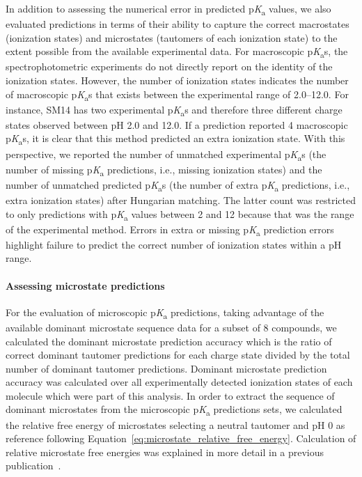 \documentclass[9pt,lineno,final]{elife}
\newcommand{\pKa}{p\textit{K}\textsubscript{a}}
\begin{document}
In addition to assessing the numerical error in predicted \pKa{} values, we also evaluated predictions in terms of their ability to capture the correct macrostates (ionization states) and microstates (tautomers of each ionization state) to the extent possible from the available experimental data. 
For macroscopic \pKa{}s, the spectrophotometric experiments do not directly report on the identity of the ionization states. 
However, the number of ionization states indicates the number of macroscopic \pKa{}s that exists between the experimental range of 2.0--12.0. 
For instance, SM14 has two experimental \pKa{}s and therefore three different charge states observed between pH 2.0 and 12.0. 
If a prediction reported 4 macroscopic \pKa{}s, it is clear that this method predicted an extra ionization state. 
With this perspective, we reported the number of unmatched experimental \pKa{}s (the number of missing \pKa{} predictions, i.e., missing ionization states) and the number of unmatched predicted \pKa{}s (the number of extra \pKa{} predictions, i.e., extra ionization states) after Hungarian matching. 
The latter count was restricted to only predictions with \pKa{} values between 2 and 12 because that was the range of the experimental method. 
Errors in extra or missing \pKa{} prediction errors highlight failure to predict the correct number of ionization states within a pH range.


\paragraph{Assessing microstate predictions}

For the evaluation of microscopic \pKa{} predictions, taking advantage of the available dominant microstate sequence data for a subset of 8 compounds, we calculated the dominant microstate prediction accuracy which is the ratio of correct dominant tautomer predictions for each charge state divided by the total number of dominant tautomer predictions. 
Dominant microstate prediction accuracy was calculated over all experimentally detected ionization states of each molecule which were part of this analysis. 
In order to extract the sequence of dominant microstates from the microscopic \pKa{} predictions sets, we calculated the relative free energy of microstates selecting a neutral tautomer and pH 0 as reference following Equation~\ref{eq:microstate_relative_free_energy}. 
Calculation of relative microstate free energies was explained in more detail in a previous publication~\citep{Gunner:2020:J.Comput.AidedMol.Des.}. 
\end{document}
